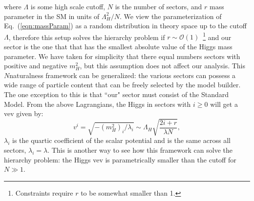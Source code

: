 \documentclass[nofootinbib,twocolumn,preprintnumbers]{revtex4-1}
\begin{document}
where $\Lambda$ is some high scale cutoff, $N$ is the number of sectors, and $r$ mass parameter in the SM in units of $\Lambda_H^2/N$. We view the parameterization of Eq.~(\ref{eqn:massParam}) as a random distribution in theory space up to the cutoff $\Lambda$, therefore this setup solves the hierarchy problem if $r \sim \mathcal{O}(1)$~\cite{Arkani-Hamed:2016rle}\footnote{Constraints require $r$ to be somewhat smaller than 1.} and our sector is the one that that has the smallest absolute value of the Higgs mass parameter. We have taken for simplicity that there equal numbers sectors with positive and negative $m_H^2$, but this assumption does not affect our analysis. This $N$naturalness framework can be generalized: the various sectors can possess a wide range of particle content that can be freely selected by the model builder. The one exception to this is that ``our" sector must consist of the Standard Model.
From the above Lagrangians, the Higgs in sectors with $i \geq 0$ will get a vev given by:
\begin{equation}\label{eqn:vevs}
v^i = \sqrt{-(m_H^2)_i/\lambda_i} \sim \Lambda_H\sqrt{\frac{2i + r}{\lambda N}},
\end{equation}
$\lambda_i$ is the quartic coefficient of the scalar potential and is the same across all sectors, $\lambda_i=\lambda$. This is another way to see how this framework can solve the hierarchy problem: the Higgs vev is parametrically smaller than the cutoff for $N \gg 1$. 
%
%
%
%
\end{document}
